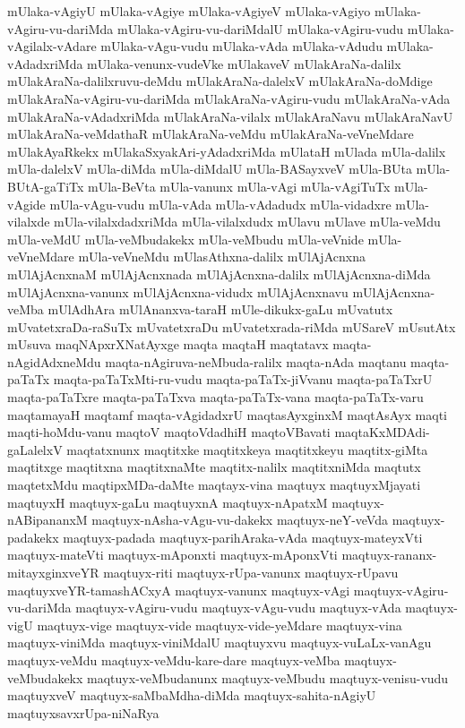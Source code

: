 {mUlaka-vAgiyU
mUlaka-vAgiye
mUlaka-vAgiyeV
mUlaka-vAgiyo
mUlaka-vAgiru-vu-dariMda
mUlaka-vAgiru-vu-dariMdalU
mUlaka-vAgiru-vudu
mUlaka-vAgilalx-vAdare
mUlaka-vAgu-vudu
mUlaka-vAda
mUlaka-vAdudu
mUlaka-vAdadxriMda
mUlaka-venunx-vudeVke
mUlakaveV
mUlakAraNa-dalilx
mUlakAraNa-dalilxruvu-deMdu
mUlakAraNa-dalelxV
mUlakAraNa-doMdige
mUlakAraNa-vAgiru-vu-dariMda
mUlakAraNa-vAgiru-vudu
mUlakAraNa-vAda
mUlakAraNa-vAdadxriMda
mUlakAraNa-vilalx
mUlakAraNavu
mUlakAraNavU
mUlakAraNa-veMdathaR
mUlakAraNa-veMdu
mUlakAraNa-veVneMdare
mUlakAyaRkekx
mUlakaSxyakAri-yAdadxriMda
mUlataH
mUlada
mUla-dalilx
mUla-dalelxV
mUla-diMda
mUla-diMdalU
mUla-BASayxveV
mUla-BUta
mUla-BUtA-gaTiTx
mUla-BeVta
mUla-vanunx
mUla-vAgi
mUla-vAgiTuTx
mUla-vAgide
mUla-vAgu-vudu
mUla-vAda
mUla-vAdadudx
mUla-vidadxre
mUla-vilalxde
mUla-vilalxdadxriMda
mUla-vilalxdudx
mUlavu
mUlave
mUla-veMdu
mUla-veMdU
mUla-veMbudakekx
mUla-veMbudu
mUla-veVnide
mUla-veVneMdare
mUla-veVneMdu
mUlasAthxna-dalilx
mUlAjAcnxna
mUlAjAcnxnaM
mUlAjAcnxnada
mUlAjAcnxna-dalilx
mUlAjAcnxna-diMda
mUlAjAcnxna-vanunx
mUlAjAcnxna-vidudx
mUlAjAcnxnavu
mUlAjAcnxna-veMba
mUlAdhAra
mUlAnanxva-taraH
mUle-dikukx-gaLu
mUvatutx
mUvatetxraDa-raSuTx
mUvatetxraDu
mUvatetxrada-riMda
mUSareV
mUsutAtx
mUsuva
maqNApxrXNatAyxge
maqta
maqtaH
maqtatavx
maqta-nAgidAdxneMdu
maqta-nAgiruva-neMbuda-ralilx
maqta-nAda
maqtanu
maqta-paTaTx
maqta-paTaTxMti-ru-vudu
maqta-paTaTx-jiVvanu
maqta-paTaTxrU
maqta-paTaTxre
maqta-paTaTxva
maqta-paTaTx-vana
maqta-paTaTx-varu
maqtamayaH
maqtamf
maqta-vAgidadxrU
maqtasAyxginxM
maqtAsAyx
maqti
maqti-hoMdu-vanu
maqtoV
maqtoVdadhiH
maqtoVBavati
maqtaKxMDAdi-gaLalelxV
maqtatxnunx
maqtitxke
maqtitxkeya
maqtitxkeyu
maqtitx-giMta
maqtitxge
maqtitxna
maqtitxnaMte
maqtitx-nalilx
maqtitxniMda
maqtutx
maqtetxMdu
maqtipxMDa-daMte
maqtayx-vina
maqtuyx
maqtuyxMjayati
maqtuyxH
maqtuyx-gaLu
maqtuyxnA
maqtuyx-nApatxM
maqtuyx-nABipananxM
maqtuyx-nAsha-vAgu-vu-dakekx
maqtuyx-neY-veVda
maqtuyx-padakekx
maqtuyx-padada
maqtuyx-parihAraka-vAda
maqtuyx-mateyxVti
maqtuyx-mateVti
maqtuyx-mAponxti
maqtuyx-mAponxVti
maqtuyx-rananx-mitayxginxveYR
maqtuyx-riti
maqtuyx-rUpa-vanunx
maqtuyx-rUpavu
maqtuyxveYR-tamashACxyA
maqtuyx-vanunx
maqtuyx-vAgi
maqtuyx-vAgiru-vu-dariMda
maqtuyx-vAgiru-vudu
maqtuyx-vAgu-vudu
maqtuyx-vAda
maqtuyx-vigU
maqtuyx-vige
maqtuyx-vide
maqtuyx-vide-yeMdare
maqtuyx-vina
maqtuyx-viniMda
maqtuyx-viniMdalU
maqtuyxvu
maqtuyx-vuLaLx-vanAgu
maqtuyx-veMdu
maqtuyx-veMdu-kare-dare
maqtuyx-veMba
maqtuyx-veMbudakekx
maqtuyx-veMbudanunx
maqtuyx-veMbudu
maqtuyx-venisu-vudu
maqtuyxveV
maqtuyx-saMbaMdha-diMda
maqtuyx-sahita-nAgiyU
maqtuyxsavxrUpa-niNaRya
}
